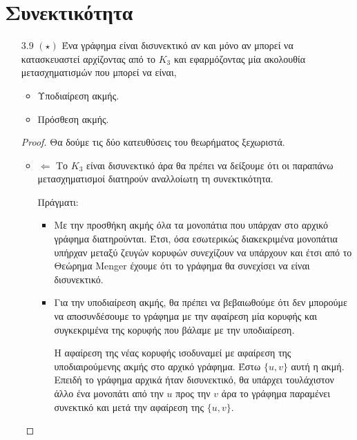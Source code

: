 \documentclass[a4paper, oneside, 11pt]{article}
\theoremstyle{definition}
\begin{document}
\section{Συνεκτικότητα}
\begin{enumerate}
   \item[3.9 $(\star)$]
      Ένα γράφημα είναι δισυνεκτικό αν και μόνο αν μπορεί να κατασκευαστεί
      αρχίζοντας από το $K_3$ και εφαρμόζοντας μία ακολουθία μετασχηματισμών
      που μπορεί να είναι,

      \begin{itemize}
         \item Υποδιαίρεση ακμής.
         \item Πρόσθεση ακμής.
      \end{itemize}

      \begin{proof}
         Θα δούμε τις δύο κατευθύσεις του θεωρήματος ξεχωριστά.
         \begin{itemize}
            \item $\Leftarrow$
               Το $K_3$ είναι δισυνεκτικό άρα θα πρέπει να δείξουμε ότι
               οι παραπάνω μετασχηματισμοί διατηρούν αναλλοίωτη τη
               συνεκτικότητα.

               Πράγματι:

               \begin{itemize}
               \item
               Με την προσθήκη ακμής όλα τα μονοπάτια που υπάρχαν στο
               αρχικό γράφημα διατηρούνται. Έτσι, όσα εσωτερικώς διακεκριμένα
               μονοπάτια υπήρχαν μεταξύ ζευγών κορυφών συνεχίζουν να
               υπάρχουν και έτσι από το Θεώρημα Menger έχουμε ότι το
               γράφημα θα συνεχίσει να είναι δισυνεκτικό.

               \item
               Για την υποδιαίρεση ακμής, θα πρέπει να βεβαιωθούμε ότι
               δεν μπορούμε να αποσυνδέσουμε το γράφημα με την αφαίρεση
               μία κορυφής και συγκεκριμένα της κορυφής που βάλαμε με
               την υποδιαίρεση.

               Η αφαίρεση της νέας κορυφής ισοδυναμεί με αφαίρεση της
               υποδιαιρούμενης ακμής στο αρχικό γράφημα. Έστω $\{u, v\}$
               αυτή η ακμή. Επειδή το γράφημα
               αρχικά ήταν δισυνεκτικό, θα υπάρχει τουλάχιστον άλλο ένα
               μονοπάτι από την $u$ προς την $v$ άρα το γράφημα παραμένει
               συνεκτικό και μετά την αφαίρεση της $\{u, v\}$.
               \end{itemize}


\end{itemize}
\end{proof}
\end{enumerate}
\end{document}
